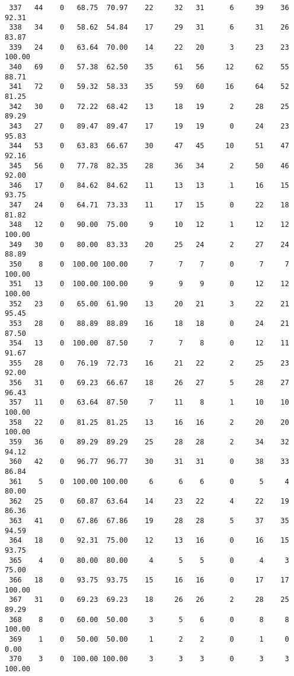 \begin{verbatim}
 337   44    0   68.75  70.97    22     32   31      6     39    36    92.31
 338   34    0   58.62  54.84    17     29   31      6     31    26    83.87
 339   24    0   63.64  70.00    14     22   20      3     23    23   100.00
 340   69    0   57.38  62.50    35     61   56     12     62    55    88.71
 341   72    0   59.32  58.33    35     59   60     16     64    52    81.25
 342   30    0   72.22  68.42    13     18   19      2     28    25    89.29
 343   27    0   89.47  89.47    17     19   19      0     24    23    95.83
 344   53    0   63.83  66.67    30     47   45     10     51    47    92.16
 345   56    0   77.78  82.35    28     36   34      2     50    46    92.00
 346   17    0   84.62  84.62    11     13   13      1     16    15    93.75
 347   24    0   64.71  73.33    11     17   15      0     22    18    81.82
 348   12    0   90.00  75.00     9     10   12      1     12    12   100.00
 349   30    0   80.00  83.33    20     25   24      2     27    24    88.89
 350    8    0  100.00 100.00     7      7    7      0      7     7   100.00
 351   13    0  100.00 100.00     9      9    9      0     12    12   100.00
 352   23    0   65.00  61.90    13     20   21      3     22    21    95.45
 353   28    0   88.89  88.89    16     18   18      0     24    21    87.50
 354   13    0  100.00  87.50     7      7    8      0     12    11    91.67
 355   28    0   76.19  72.73    16     21   22      2     25    23    92.00
 356   31    0   69.23  66.67    18     26   27      5     28    27    96.43
 357   11    0   63.64  87.50     7     11    8      1     10    10   100.00
 358   22    0   81.25  81.25    13     16   16      2     20    20   100.00
 359   36    0   89.29  89.29    25     28   28      2     34    32    94.12
 360   42    0   96.77  96.77    30     31   31      0     38    33    86.84
 361    5    0  100.00 100.00     6      6    6      0      5     4    80.00
 362   25    0   60.87  63.64    14     23   22      4     22    19    86.36
 363   41    0   67.86  67.86    19     28   28      5     37    35    94.59
 364   18    0   92.31  75.00    12     13   16      0     16    15    93.75
 365    4    0   80.00  80.00     4      5    5      0      4     3    75.00
 366   18    0   93.75  93.75    15     16   16      0     17    17   100.00
 367   31    0   69.23  69.23    18     26   26      2     28    25    89.29
 368    8    0   60.00  50.00     3      5    6      0      8     8   100.00
 369    1    0   50.00  50.00     1      2    2      0      1     0     0.00
 370    3    0  100.00 100.00     3      3    3      0      3     3   100.00

\end{verbatim}
